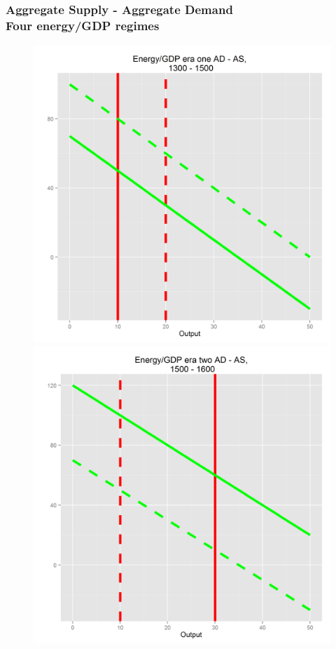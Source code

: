 \documentclass[final]{beamer}
\begin{document}
\begin{frame}
		\frametitle{Aggregate Supply - Aggregate Demand \\ Four energy/GDP regimes}
\begin{figure}[p!]
		\label{fig:asad}		
		\centerline{
		\mbox{\includegraphics[height=0.35\textheight]{era1}}
		\mbox{\includegraphics[height=0.35\textheight]{era2}}
}
\end{figure}
\end{frame}
\end{document}
